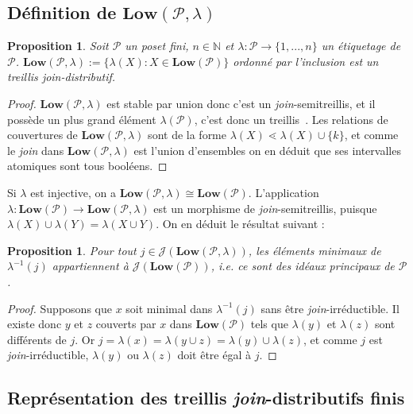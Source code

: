\documentclass[leqno, 12pt]{amsart}
\numberwithin{equation}{section}
\newtheorem{prop}[thm]{Proposition}
\newcommand{\Pos}{\mathcal P}
\newcommand{\N}{\mathbb{N}}
\newcommand{\JIrr}{\mathcal J}
\newcommand{\IdL}{\mathbf{Low}}
\begin{document}
\subsection{Définition de $\IdL(\Pos,\lambda)$}
\label{sec:def_low}
\begin{prop}
Soit $\Pos$ un poset fini, $n\in \N$ et $\lambda :\Pos \to \{1,...,n\}$ un étiquetage de $\Pos$.
$\IdL(\Pos,\lambda):=\{\lambda(X):X\in \IdL(\Pos)\}$ ordonné par l'inclusion est un treillis \emph{join}-distributif.
\end{prop}
\begin{proof}
  $\IdL(\Pos,\lambda)$ est stable par union donc c'est un \emph{join}-semitreillis, et il possède un plus grand élément $\lambda(\Pos)$, c'est donc un treillis~\cite[Proposition 3.3.1]{Stan12}. Les relations de couvertures de $\IdL(\Pos,\lambda)$ sont de la forme $\lambda(X)\lessdot \lambda(X)\cup\{k\}$, et comme le \emph{join} dans $\IdL(\Pos,\lambda)$ est l'union d'ensembles on en déduit que ses intervalles atomiques sont tous booléens.
\end{proof}
Si $\lambda$ est injective, on a $\IdL(\Pos, \lambda)\cong \IdL(\Pos)$.
L'application $\lambda :\IdL(\Pos)\to\IdL(\Pos, \lambda)$ est un morphisme de \emph{join}-semitreillis, puisque $\lambda(X)\cup\lambda(Y)=\lambda (X\cup Y)$. On en déduit le résultat suivant :
\begin{prop}
   Pour tout $j\in \JIrr(\IdL(\Pos, \lambda))$, les éléments minimaux de $\lambda^{-1}(j)$ appartiennent à $\JIrr(\IdL(\Pos))$, \emph{i.e.} ce sont des idéaux principaux de $\Pos$.
   \label{prop:2}
\end{prop}
\begin{proof}
   Supposons que $x$ soit minimal dans $\lambda^{-1}(j)$ sans être \emph{join}-irréductible. Il existe donc $y$ et $z$ couverts par $x$ dans $\IdL(\Pos)$ tels que $\lambda(y)$ et $\lambda(z)$ sont différents de $j$. Or $j=\lambda(x)= \lambda(y\cup z)=\lambda(y)\cup \lambda(z)$, et comme $j$ est \emph{join}-irréductible, $\lambda(y)$ ou $\lambda(z)$ doit être égal à $j$.
\end{proof}

\subsection{Représentation des treillis \emph{join}-distributifs finis}
\label{sec:repr_join_dis}
\end{document}
